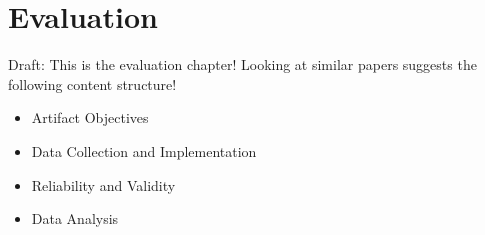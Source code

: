 \chapter{\leavevmode Evaluation}

\label{chap:evaluation}

% 



Draft: This is the evaluation chapter! Looking at similar papers suggests the following content structure!

\begin{itemize}
  \item Artifact Objectives
  \item Data Collection and Implementation
  \item Reliability and Validity
  \item Data Analysis
\end{itemize}

